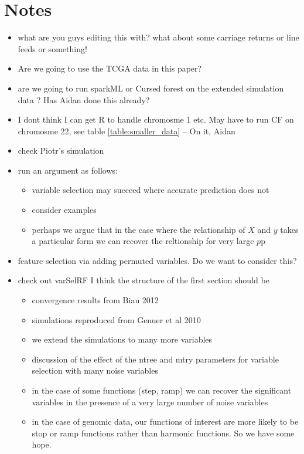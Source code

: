 \documentclass[10pt,a4paper]{article}  %
\begin{document}
\section*{Notes}
\begin{itemize}
\item what are you guys editing this with?  what about some carriage
  returns or line feeds or something!
\item Are we going to use the TCGA data in this paper?
\item are we going to run sparkML or Cursed forest on the extended
  simulation data \cite[]{Genuer.et.al.2010}? Has Aidan done this already?
\item I dont think I can get R to handle chromosme 1 etc. May have to run CF on chromosme 22, see table
  \ref{table:smaller_data} -- On it, Aidan
\item check Piotr's simulation
\item run an argument as follows:
  \begin{itemize}
  \item variable  selection may succeed where accurate prediction does not
  \item consider  \cite{Segal.2004} examples
  \item  perhaps we argue that in the case where the relationship of $X$ and $y$ takes a particular form we can recover
    the reltionship for very large $p$p
  \end{itemize}
\item \cite{Tuv.et.al.2009} feature selection via adding permuted variables. Do we want to consider this?
\item check out varSelRF
I think the structure of the first section should be
\begin{itemize}
\item  convergence results from Biau 2012
\item simulations reproduced from Genuer et al 2010
\item we extend the simulations to many more variables
\item discussion of the effect of the ntree and mtry parameters for variable selection with many noise variables
\item  in the case of some functions (step, ramp) we can recover the significant variables in the presence of a very large number of noise variables
\item in the case of genomic data, our functions of interest are more likely to be stop or ramp functions rather than harmonic functions. So we have some hope.
\end{itemize}


\end{itemize}
\end{document}
